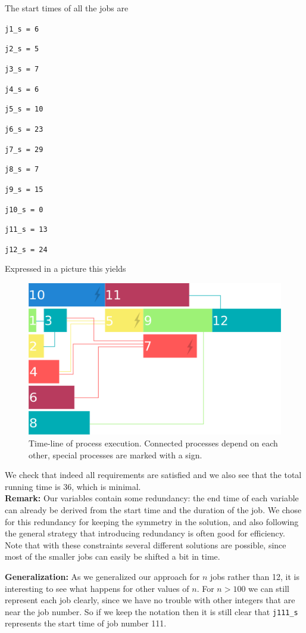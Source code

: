 \documentclass[a4paper]{article}
\begin{document}
The start times of all the jobs are 

{\tt j1\_s = 6 }

{\tt j2\_s = 5 }

{\tt j3\_s = 7 }

{\tt j4\_s = 6 }

{\tt j5\_s = 10 }

{\tt j6\_s = 23 }

{\tt j7\_s = 29 }

{\tt j8\_s = 7 }

{\tt j9\_s = 15 }

{\tt j10\_s = 0 }

{\tt j11\_s = 13 }

{\tt j12\_s = 24 }

Expressed in a picture this yields

\begin{figure}[H]
		\centering
			\includegraphics[scale=0.7]{timeline.png}
		\caption{Time-line of process execution. Connected processes depend on each other, special processes are marked with a sign.}
	\end{figure}

We check that indeed all requirements are satisfied and we also see that the total running time is 36, which is minimal.\\

{\bf Remark:}
Our variables contain some redundancy: the end time of each variable can already be derived from the start time and the duration of the job. We chose for this redundancy for keeping the symmetry in the solution, and also following the general strategy that introducing redundancy is often good for efficiency.\\

Note that with these constraints several different solutions are possible, since most of the smaller jobs can easily be shifted a bit in time.

\vspace{3mm}

{\bf Generalization:} 
As we generalized our approach for $n$ jobs rather than 12, it is interesting to see what happens for other values of $n$. For $n > 100$ we can still represent each job clearly, since we have no trouble with other integers that are near the job number. So if we keep the notation then it is still clear that {\tt j111\_s} represents the start time of job number 111.
\end{document}

